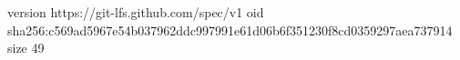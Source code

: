 version https://git-lfs.github.com/spec/v1
oid sha256:c569ad5967e54b037962ddc997991e61d06b6f351230f8cd0359297aea737914
size 49
